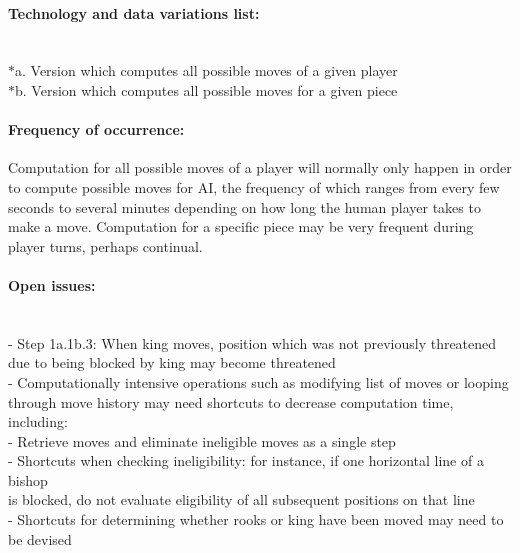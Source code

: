 \documentclass{article}
\begin{document}
\paragraph{Technology and data variations list:}\mbox{}\\
$*$a. Version which computes all possible moves of a given player\\
$*$b. Version which computes all possible moves for a given piece

\paragraph{Frequency of occurrence:} Computation for all possible moves of a player will normally only happen in order to compute possible moves for AI, the frequency of which ranges from every few seconds to several minutes depending on how long the human player takes to make a move. Computation for a specific piece may be very frequent during player turns, perhaps continual.

\paragraph{Open issues:}\mbox{}\\
- Step 1a.1b.3: When king moves, position which was not previously threatened due to being blocked by king may become threatened\\
- Computationally intensive operations such as modifying list of moves or looping through move history may need shortcuts to decrease computation time, including:\\
\indent- Retrieve moves and eliminate ineligible moves as a single step\\
\indent\indent- Shortcuts when checking ineligibility: for instance, if one horizontal line of a bishop \\
\indent\indent is blocked, do not evaluate eligibility of all subsequent positions on that line\\
\indent- Shortcuts for determining whether rooks or king have been moved may need to be devised\\
\end{document}

